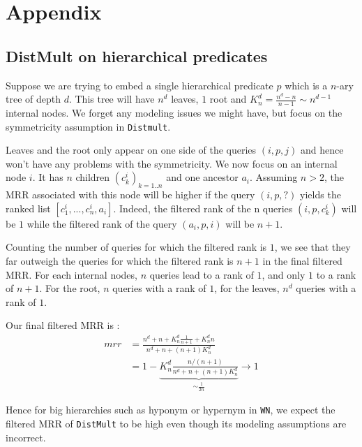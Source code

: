 \documentclass{article}
\begin{document}



\clearpage

\section{Appendix}
\subsection{DistMult on hierarchical predicates}
Suppose we are trying to embed a single hierarchical predicate $p$ which is a $n$-ary tree of depth $d$. This tree will have $n^d$ leaves, $1$ root and $K_n^d=\frac{n^d-n}{n-1}\sim n^{d-1}$ internal nodes. We forget any modeling issues we might have, but focus on the symmetricity assumption in {\tt Distmult}.

Leaves and the root only appear on one side of the queries $(i, p, j)$ and hence won't have any problems with the symmetricity. We now focus on an internal node $i$. It has $n$ children $(c^i_k)_{k=1..n}$ and one ancestor $a_i$. Assuming $n > 2$, the MRR associated with this node will be higher if the query $(i, p, ?)$ yields the ranked list $[c^i_1, ..., c^i_n, a_i]$. Indeed, the filtered rank of the n queries $(i, p, c^i_k)$ will be $1$ while the filtered rank of the query $(a_i,p, i)$ will be $n+1$.

Counting the number of queries for which the filtered rank is $1$, we see that they far outweigh the queries for which the filtered rank is $n+1$ in the final filtered MRR. For each internal nodes, $n$ queries lead to a rank of $1$, and only $1$ to a rank of $n+1$. For the root, $n$ queries with a rank of $1$, for the leaves, $n^d$ queries with a rank of $1$.

Our final filtered MRR is :
\begin{align}
mrr &= \frac{n^d + n +K_n^d\frac{1}{n+1}+K_n^d n}{n^d + n + (n+1)K_n^d} \\
&= 1 - \underbrace{K_n^d\frac{n/(n+1)}{n^d + n + (n+1)K_n^d}}_{\sim\frac{1}{2n}} \rightarrow 1
\end{align}

Hence for big hierarchies such as hyponym or hypernym in {\tt WN}, we expect the filtered MRR of {\tt DistMult} to be high even though its modeling assumptions are incorrect.
\end{document}
